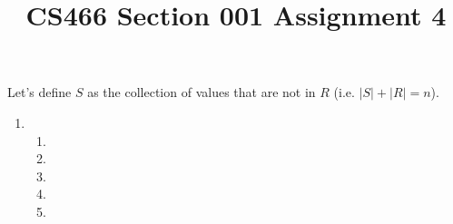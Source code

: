 \documentclass[12pt]{article}
\title{CS466 Section 001 Assignment 4}
\begin{document}
\maketitle

Let's define $S$ as the collection of values that are not in $R$ (i.e. $|S| + |R| = n$).
\begin{enumerate}
\item
\begin{enumerate}
\item
\item
\item
\item
\item
\end{enumerate}
\end{enumerate}
\end{document}
